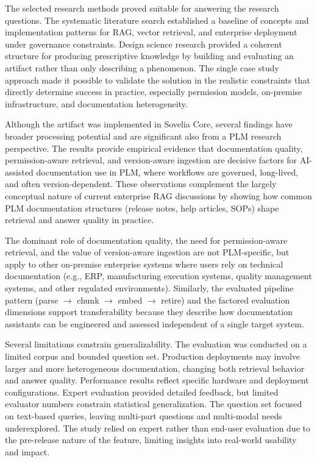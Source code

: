 The selected research methods proved suitable for answering the research questions. The systematic literature search established a baseline of concepts and implementation patterns for RAG, vector retrieval, and enterprise deployment under governance constraints. Design science research provided a coherent structure for producing prescriptive knowledge by building and evaluating an artifact rather than only describing a phenomenon. The single case study approach made it possible to validate the solution in the realistic constraints that directly determine success in practice, especially permission models, on-premise infrastructure, and documentation heterogeneity.

Although the artifact was implemented in Sovelia Core, several findings have broader processing potential and are significant also from a PLM research perspective. The results provide empirical evidence that documentation quality, permission-aware retrieval, and version-aware ingestion are decisive factors for AI-assisted documentation use in PLM, where workflows are governed, long-lived, and often version-dependent. These observations complement the largely conceptual nature of current enterprise RAG discussions by showing how common PLM documentation structures (release notes, help articles, SOPs) shape retrieval and answer quality in practice.

The dominant role of documentation quality, the need for permission-aware retrieval, and the value of version-aware ingestion are not PLM-specific, but apply to other on-premise enterprise systems where users rely on technical documentation (e.g., ERP, manufacturing execution systems, quality management systems, and other regulated environments). Similarly, the evaluated pipeline pattern (parse $\rightarrow$ chunk $\rightarrow$ embed $\rightarrow$ retire) and the factored evaluation dimensions support transferability because they describe how documentation assistants can be engineered and assessed independent of a single target system.

Several limitations constrain generalizability. The evaluation was conducted on a limited corpus and bounded question set. Production deployments may involve larger and more heterogeneous documentation, changing both retrieval behavior and answer quality. Performance results reflect specific hardware and deployment configurations. Expert evaluation provided detailed feedback, but limited evaluator numbers constrain statistical generalization. The question set focused on text-based queries, leaving multi-part questions and multi-modal needs underexplored. The study relied on expert rather than end-user evaluation due to the pre-release nature of the feature, limiting insights into real-world usability and impact.

